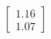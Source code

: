 \documentclass[preview]{standalone}
\begin{document}
\begin{align*}
\begin{bmatrix} 1.16 \\ 1.07 \end{bmatrix}
\end{align*}
\end{document}
